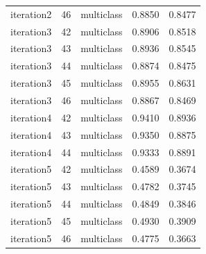 \begin{table}
\begin{tabular}{lrlrr}
iteration2 & 46 & multiclass & 0.8850 & 0.8477 \\
iteration3 & 42 & multiclass & 0.8906 & 0.8518 \\
iteration3 & 43 & multiclass & 0.8936 & 0.8545 \\
iteration3 & 44 & multiclass & 0.8874 & 0.8475 \\
iteration3 & 45 & multiclass & 0.8955 & 0.8631 \\
iteration3 & 46 & multiclass & 0.8867 & 0.8469 \\
iteration4 & 42 & multiclass & 0.9410 & 0.8936 \\
iteration4 & 43 & multiclass & 0.9350 & 0.8875 \\
iteration4 & 44 & multiclass & 0.9333 & 0.8891 \\
iteration5 & 42 & multiclass & 0.4589 & 0.3674 \\
iteration5 & 43 & multiclass & 0.4782 & 0.3745 \\
iteration5 & 44 & multiclass & 0.4849 & 0.3846 \\
iteration5 & 45 & multiclass & 0.4930 & 0.3909 \\
iteration5 & 46 & multiclass & 0.4775 & 0.3663 \\
\bottomrule
\end{tabular}
\end{table}
